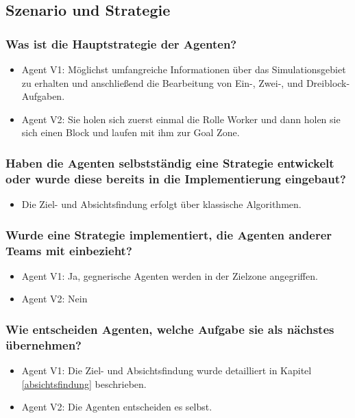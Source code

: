 \documentclass[runningheads]{llncs}
\begin{document}
\subsection{Szenario und Strategie}
\subsubsection{Was ist die Hauptstrategie der Agenten?}
\begin{itemize}
\item Agent V1: Möglichst umfangreiche Informationen über das Simulationsgebiet zu erhalten und anschließend die Bearbeitung von Ein-, Zwei-, und Dreiblock-Aufgaben.
\item Agent V2: Sie holen sich zuerst einmal die Rolle Worker und dann holen sie sich einen Block und laufen mit ihm zur Goal Zone.
\end{itemize}

\subsubsection{Haben die Agenten selbstständig eine Strategie entwickelt oder wurde diese bereits in die Implementierung eingebaut?}
\begin{itemize}
\item Die Ziel- und Absichtsfindung erfolgt über klassische Algorithmen.
\end{itemize}

\subsubsection{Wurde eine Strategie implementiert, die Agenten anderer Teams mit einbezieht?}
\begin{itemize}
\item Agent V1: Ja, gegnerische Agenten werden in der Zielzone angegriffen.
\item Agent V2: Nein
\end{itemize}

\subsubsection{Wie entscheiden Agenten, welche Aufgabe sie als nächstes übernehmen?}
\begin{itemize}
\item Agent V1: Die Ziel- und Absichtsfindung wurde detailliert in Kapitel \ref{absichtsfindung} beschrieben.
\item Agent V2: Die Agenten entscheiden es selbst.
\end{itemize}
\end{document}
